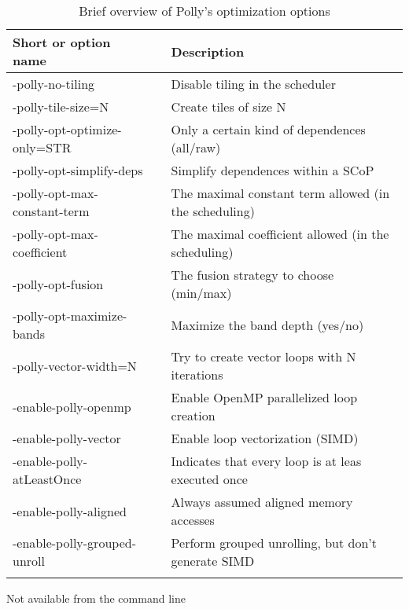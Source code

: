 \begin{table}[htbp]
  \caption{Brief overview of Polly's optimization options}
  \begin{tabularx}{\textwidth}{ l p{1mm} X}
    Short or option name          && Description \\
    \hline
    -polly-no-tiling              && Disable tiling in the scheduler  \\
    -polly-tile-size=N\footnotemark[1] && Create tiles of size N \\
    -polly-opt-optimize-only=STR  && Only a certain kind of dependences (all/raw) \\
    -polly-opt-simplify-deps      && Simplify dependences within a SCoP    \\
    -polly-opt-max-constant-term  && The maximal constant term allowed (in the scheduling) \\
    -polly-opt-max-coefficient    && The maximal coefficient allowed (in the scheduling)  \\
    -polly-opt-fusion             && The fusion strategy to choose (min/max) \\
    -polly-opt-maximize-bands     && Maximize the band depth (yes/no) \\
    -polly-vector-width=N\footnotemark[1]  && Try to create vector loops with N iterations \\
    -enable-polly-openmp          && Enable OpenMP parallelized loop creation \\
    -enable-polly-vector          && Enable loop vectorization (SIMD) \\
    -enable-polly-atLeastOnce     && Indicates that every loop is at leas executed once \\
    -enable-polly-aligned         && Always assumed aligned memory accesses \\
    -enable-polly-grouped-unroll  && Perform grouped unrolling, but don't generate SIMD \\
     &&  \\ 
  \end{tabularx}
  \label{tab:PollyOptions}
  \footnotemark[1] Not available from the command line \\
\end{table}



